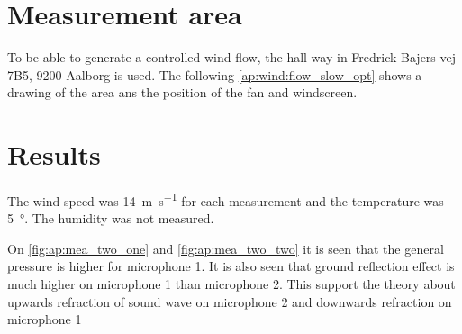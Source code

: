 \section*{Measurement area}
To be able to generate a controlled wind flow, the hall way in Fredrick Bajers vej 7B5, 9200 Aalborg is used. The following \autoref{ap:wind:flow_slow_opt} shows a drawing of the area ans the position of the fan and windscreen.


\section*{Results}



The wind speed was \SI{14}{\meter\per\second} for each measurement and the temperature was \SI{5}{\degree}. The humidity was not measured. 


On \autoref{fig:ap:mea_two_one} and \autoref{fig:ap:mea_two_two} it is seen that the general pressure is higher for microphone 1. It is also seen that ground reflection effect is much higher on microphone 1 than microphone 2. This support the theory about upwards refraction of sound wave on microphone 2 and downwards refraction on microphone 1 



